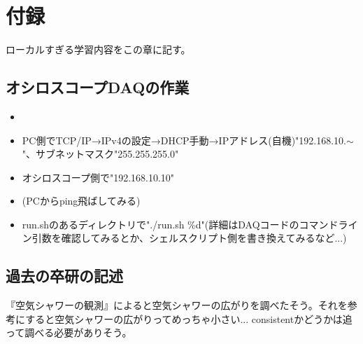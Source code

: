 \documentclass[../../main.tex]{subfiles}
\numberwithin{equation}{section}
\numberwithin{table}{section}
\numberwithin{figure}{section}
\begin{document}
\section{付録}
  ローカルすぎる学習内容をこの章に記す。
  \subsection{オシロスコープDAQの作業}
    \begin{itemize}
      \item {}
      \item PC側でTCP/IP→IPv4の設定→DHCP手動→IPアドレス(自機)"192.168.10.$\sim$"、サブネットマスク"255.255.255.0"
      \item オシロスコープ側で"192.168.10.10"
      \item (PCからping飛ばしてみる)
      \item run.shのあるディレクトリで"./run.sh \%d"(詳細はDAQコードのコマンドライン引数を確認してみるとか、シェルスクリプト側を書き換えてみるなど...)
    \end{itemize}
	\subsection{過去の卒研の記述}
    『空気シャワーの観測』によると空気シャワーの広がりを調べたそう。それを参考にすると空気シャワーの広がりってめっちゃ小さい... consistentかどうかは追って調べる必要がありそう。
\end{document}
